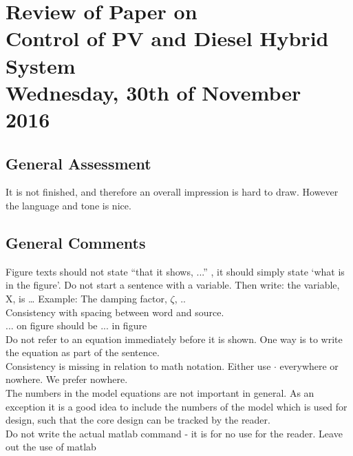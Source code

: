 
\renewcommand{\vec}[1]{\boldsymbol{\mathbf{#1}}}

\renewcommand\chaptername{KAPITEL}
\renewcommand\contentsname{Indhold}
\renewcommand\figurename{Figur}
\renewcommand\tablename{Tabel}

\section*{Review of Paper on\\
Control of PV and Diesel Hybrid System\\
\small Wednesday, 30th of November 2016}
\subsection{General Assessment}
It is not finished, and therefore an overall impression is hard to draw. However the language and tone is nice.

\subsection{General Comments}
\noindent Figure texts should not state “that it shows, ...” , it should simply state ‘what is in the figure’.
Do not start a sentence with a variable. Then write: the variable, X, is …
Example: The damping factor, $\zeta$, .. \\


\noindent Consistency with spacing between word and source. \\


\noindent  ... on figure should be ... in figure \\


\noindent Do not refer to an equation immediately before it is shown. One way is to write the equation as part of the sentence. \\


\noindent Consistency is missing in relation to math notation. Either use $\cdot$ everywhere or nowhere. We prefer nowhere.  \\


\noindent The numbers in the model equations are not important in general. As an exception it is a good idea to include the numbers of the model which is used for design, such that the core design can be tracked by the reader. \\

\noindent Do not write the actual matlab command - it is for no use for the reader. Leave out the use of matlab \\

